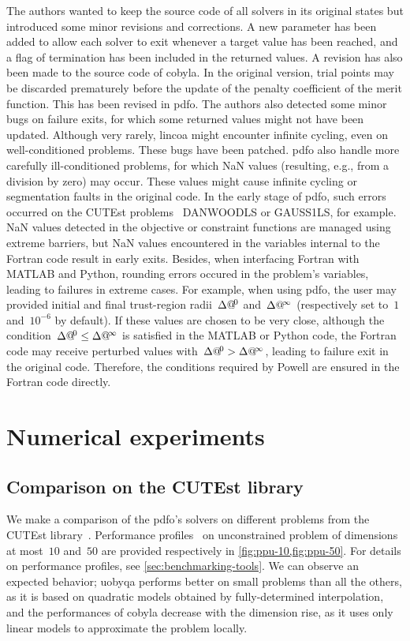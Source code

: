 The authors wanted to keep the source code of all solvers in its original states but introduced some minor revisions and corrections.
A new parameter has been added to allow each solver to exit whenever a target value has been reached, and a flag of termination has been included in the returned values.
A revision has also been made to the source code of \gls{cobyla}.
In the original version, trial points may be discarded prematurely before the update of the penalty coefficient of the merit function.
This has been revised in \gls{pdfo}.
The authors also detected some minor bugs on failure exits, for which some returned values might not have been updated.
Although very rarely, \gls{lincoa} might encounter infinite cycling, even on well-conditioned problems.
These bugs have been patched.
\Gls{pdfo} also handle more carefully ill-conditioned problems, for which NaN values (resulting, e.g., from a division by zero) may occur.
These values might cause infinite cycling or segmentation faults in the original code.
In the early stage of \gls{pdfo}, such errors occurred on the CUTEst problems~\cite{Gould_Orban_Toint_2015} DANWOODLS or GAUSS1LS, for example.
NaN values detected in the objective or constraint functions are managed using extreme barriers, but NaN values encountered in the variables internal to the Fortran code result in early exits.
Besides, when interfacing Fortran with MATLAB and Python, rounding errors occured in the problem's variables, leading to failures in extreme cases.
For example, when using \gls{pdfo}, the user may provided initial and final trust-region radii~$\rad[0]$ and~$\rad[\infty]$ (respectively set to~$1$ and~$10^{-6}$ by default).
If these values are chosen to be very close, although the condition~$\rad[0] \le \rad[\infty]$ is satisfied in the MATLAB or Python code, the Fortran code may receive perturbed values with~$\rad[0] > \rad[\infty]$, leading to failure exit in the original code.
Therefore, the conditions required by Powell are ensured in the Fortran code directly.

\section{Numerical experiments}
\label{sec:pdfo-experiments}

\subsection{Comparison on the CUTEst library}

We make a comparison of the \gls{pdfo}'s solvers on different problems from the CUTEst library~\cite{Gould_Orban_Toint_2015}.
Performance profiles~\cite{Dolan_More_2002,More_Wild_2009} on unconstrained problem of dimensions at most~$10$ and~$50$ are provided respectively in \cref{fig:ppu-10,fig:ppu-50}.
For details on performance profiles, see \cref{sec:benchmarking-tools}.
We can observe an expected behavior; \gls{uobyqa} performs better on small problems than all the others, as it is based on quadratic models obtained by fully-determined interpolation, and the performances of \gls{cobyla} decrease with the dimension rise, as it uses only linear models to approximate the problem locally.

